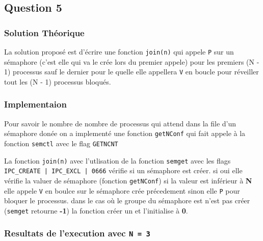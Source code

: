 \subsection{Question 5}
\subsubsection{Solution Théorique}
La solution proposé est d'écrire une fonction \texttt{join(n)} qui appele \texttt{P} sur un sémaphore
(c'est elle qui va le crée lors du premier appele) pour les premiers (N - 1)
processus sauf le dernier pour le quelle elle appellera \texttt{V} en boucle
pour réveiller tout les (N - 1) processus bloqués.

\subsubsection{Implementaion}
Pour savoir le nombre de nombre de processus qui attend dans la file d'un
sémaphore donée on a implementé une fonction \texttt{getNConf} qui fait appele à
la fonction \texttt{semctl} avec le flag \texttt{GETNCNT}

La fonction \texttt{join(n)} avec l'utlisation de la fonction \texttt{semget}
avec les flags \texttt{IPC\_CREATE | IPC\_EXCL | 0666} vérifie si un sémaphore
est créer. si oui elle vérifie la valuer de sémaphore (fonction
\texttt{getNConf}) si la valeur est inférieur à \textbf{N} elle appele
\texttt{V} en boulce sur le sémaphore crée précedement sinon elle \texttt{P}
pour bloquer le processus. dans le cas où le groupe du sémaphore est n'est pas
créer (\texttt{semget} retourne \textbf{-1}) la fonction créer un et
l'initialise à \textbf{0}.

\subsubsection{Resultats de l'execution avec \texttt{N = 3}}




